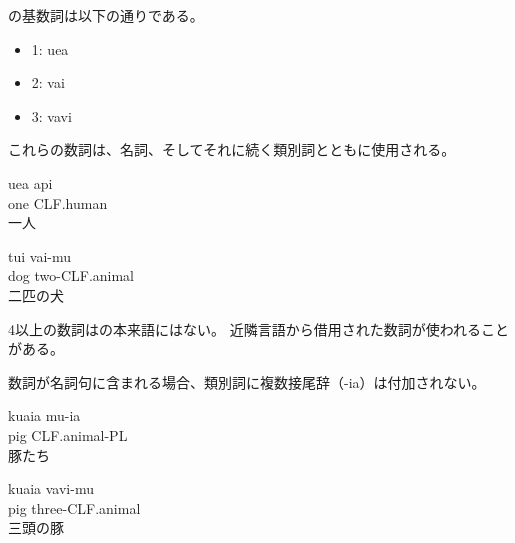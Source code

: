 \langname の基数詞は以下の通りである。
\begin{itemize}
    \item 1: uea
    \item 2: vai
    \item 3: vavi
\end{itemize}

これらの数詞は、名詞、そしてそれに続く類別詞とともに使用される。
\begin{exe}
    \ex \gll uea api \\
    one CLF.human \\
    \glt 一人
\end{exe}
\begin{exe}
    \ex \gll tui vai-mu \\
    dog two-CLF.animal \\
    \glt 二匹の犬
\end{exe}

4以上の数詞は\langname の本来語にはない。
近隣言語から借用された数詞が使われることがある。


数詞が名詞句に含まれる場合、類別詞に複数接尾辞（-ia）は付加されない。
\begin{exe}
    \ex \gll kuaia mu-ia \\
    pig CLF.animal-PL \\
    \glt 豚たち
\end{exe}
\begin{exe}
    \ex \gll kuaia vavi-mu \\
    pig three-CLF.animal \\
    \glt 三頭の豚
\end{exe}
